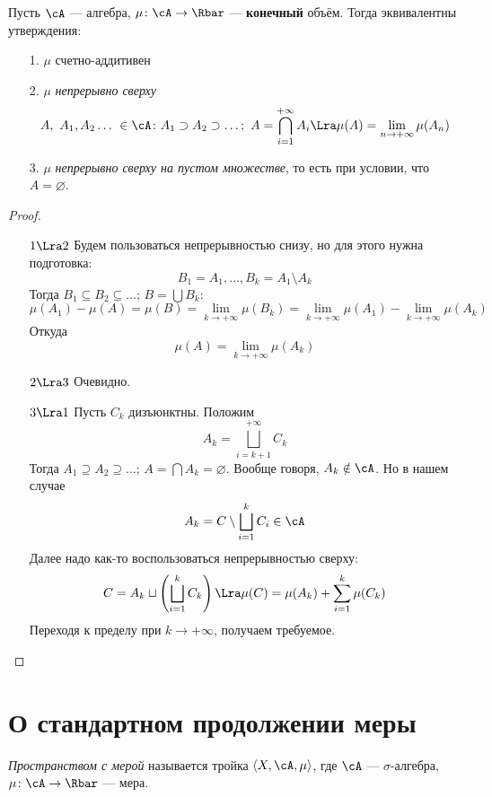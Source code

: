 \begin{theorem}
    Пусть $\cA$ --- алгебра, $\mu \colon \cA \to \Rbar$ --- \textbf{конечный} объём.
    Тогда эквивалентны утверждения:
    \begin{itemize}
        \item[1.] $\mu$ счетно-аддитивен
		\item[2.] $\mu$ \textit{непрерывно сверху}
\[
	A,~A_1, A_2 \ldots~ \in \cA\colon A_1 \supset A_2 \supset \ldots;~
    \displaystyle A = \bigcap_{i = 1}^{+\infty}{A_i} \Lra \\ \mu(A) = \lim_{n \to
    +\infty}{\mu(A_n)}
\]
        \item[3.] $\mu$ \textit{непрерывно сверху на пустом множестве}, то есть
			при условии, что $A = \varnothing$.
    \end{itemize}
\end{theorem}
\begin{proof}
	\enewline
	\begin{itemize}
		\item [$1 \Lra 2$] Будем пользоваться непрерывностью снизу, но для этого
			нужна подготовка:
\[
	B_1 = A_1, \ldots, B_k = A_1 \setminus A_k
\]
	Тогда $B_1 \subseteq B_2 \subseteq \ldots$; $B = \bigcup{B_k}$:
\[
	\mu(A_1) - \mu(A) = \mu(B) = \lim_{k \to +\infty}{\mu(B_k)}
	= \lim_{k \to +\infty}{\mu(A_1)} - \lim_{k \to +\infty}{\mu(A_k)}
\]
	Откуда
\[
	\mu(A) = \lim_{k \to +\infty}{\mu(A_k)}
\]
		\item[$2 \Lra 3$] Очевидно.
		\item[$3 \Lra 1$] Пусть $C_k$ дизъюнктны. Положим
\[
	A_k = \bigsqcup_{i = k+1}^{+\infty}{C_k}
\]
	Тогда $A_1 \supseteq A_2 \supseteq \ldots$; $A = \bigcap{A_k} = \varnothing$.
	Вообще говоря, $A_k \notin \cA$. Но в нашем случае
\[
	A_k = C \setminus \bigsqcup_{i = 1}^{k}{C_i} \in \cA
\]
	Далее надо как-то воспользоваться непрерывностью сверху:
\[
	C = A_k \sqcup \left(\bigsqcup_{i = 1}^{k}{C_k}\right)
	\Lra \mu(C) = \mu(A_k) + \sum_{i = 1}^{k}{\mu(C_k)}
\]
	Переходя к пределу при $k \to +\infty$, получаем требуемое.
	\end{itemize}
\end{proof}

\section{О стандартном продолжении меры}

\begin{definition}
    \textit{Пространством с мерой} называется тройка $\langle X, \cA, \mu \rangle$,
    где $\cA$ --- $\sigma$-алгебра, $\mu \colon \cA \to \Rbar$ --- мера.
\end{definition}

